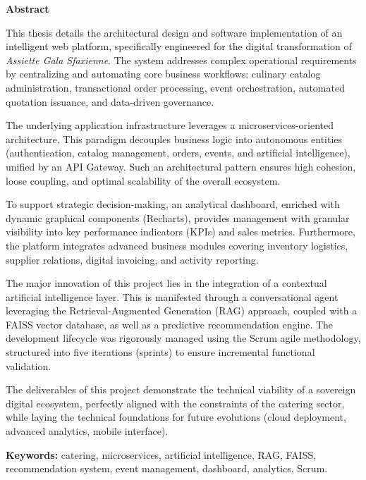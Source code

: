 \newpage
\thispagestyle{plain}

\begin{center}
    {\Large \textbf{Abstract}}\\[1cm]
\end{center}

This thesis details the architectural design and software implementation of an intelligent web platform, specifically engineered for the digital transformation of \textit{Assiette Gala Sfaxienne}. The system addresses complex operational requirements by centralizing and automating core business workflows: culinary catalog administration, transactional order processing, event orchestration, automated quotation issuance, and data-driven governance.

The underlying application infrastructure leverages a microservices-oriented architecture. This paradigm decouples business logic into autonomous entities (authentication, catalog management, orders, events, and artificial intelligence), unified by an API Gateway. Such an architectural pattern ensures high cohesion, loose coupling, and optimal scalability of the overall ecosystem.

To support strategic decision-making, an analytical dashboard, enriched with dynamic graphical components (Recharts), provides management with granular visibility into key performance indicators (KPIs) and sales metrics. Furthermore, the platform integrates advanced business modules covering inventory logistics, supplier relations, digital invoicing, and activity reporting.

The major innovation of this project lies in the integration of a contextual artificial intelligence layer. This is manifested through a conversational agent leveraging the Retrieval-Augmented Generation (RAG) approach, coupled with a FAISS vector database, as well as a predictive recommendation engine. The development lifecycle was rigorously managed using the Scrum agile methodology, structured into five iterations (sprints) to ensure incremental functional validation.

The deliverables of this project demonstrate the technical viability of a sovereign digital ecosystem, perfectly aligned with the constraints of the catering sector, while laying the technical foundations for future evolutions (cloud deployment, advanced analytics, mobile interface).

\vspace{0.8cm}
\noindent\textbf{Keywords:} catering, microservices, artificial intelligence, RAG, FAISS, recommendation system, event management, dashboard, analytics, Scrum.

\clearpage
